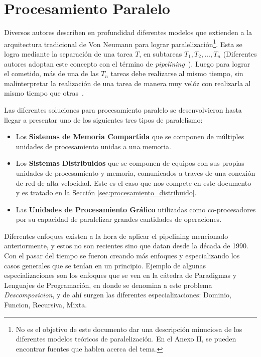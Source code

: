 \section{Procesamiento Paralelo}
\label{sec:procesamiento_paralelo}

Diversos autores\cite{moldovan93, trobec2018} describen en profundidad diferentes modelos que
extienden a la arquitectura tradicional de Von Neumann para lograr
paralelización\footnote{No es el objetivo de este documento dar una descripción minuciosa de los
diferentes modelos teóricos de paralelización. En el Anexo II, se pueden
encontrar fuentes que hablen acerca del tema.}. Esta se logra mediante la separación de una tarea $T$, en subtareas
$T_{1}, T_{2}, \ldots , T_{n}$ (Diferentes autores adoptan este concepto con el
término de \textit{\gls{pipelining}}~\cite{hyde98, trobec2018}). Luego para lograr el cometido, 
más de una de las $T_{n}$ tareas debe realizarse al mismo tiempo, sin malinterpretar la
realización de una tarea de manera muy velóz con realizarla al mismo tiempo que
otras~\cite{hyde98}.

Las diferentes soluciones para procesamiento paralelo se desenvolvieron hasta
llegar a presentar uno de los siguientes tres tipos de
paralelismo\cite{trobec2018}:

\begin{itemize}
\item Los {\bf Sistemas de Memoria Compartida} que se componen de múltiples unidades de procesamiento
unidas a una memoria.
\item Los {\bf Sistemas Distribuidos} que se componen de equipos con sus propias unidades de procesamiento
y memoria, comunicados a traves de una conexión de red de alta velocidad. Este
es el caso que nos compete en este documento y es tratado en la Sección
\ref{sec:procesamiento_distribuido}.
\item Las {\bf Unidades de Procesamiento Gráfico} utilizadas como co-procesadores por su
capacidad de paralelizar grandes cantidades de operaciones.
\end{itemize}

Diferentes enfoques existen a la hora de aplicar el \gls{pipelining} mencionado
anteriormente, y estos no son recientes sino que datan desde la década de 1990.
Con el pasar del tiempo se fueron creando más enfoques y especializando los
casos generales que se tenían en un principio. Ejemplo de algunas
especializaciones son los enfoques que se ven en la cátedra de Paradigmas y Lenguajes 
de Programación\cite{pylp1}, en donde se denomina a este problema
\textit{Descomposicion}, y de ahí surgen las diferentes especializaciones:
Dominio, Funcion, Recursiva, Mixta.

